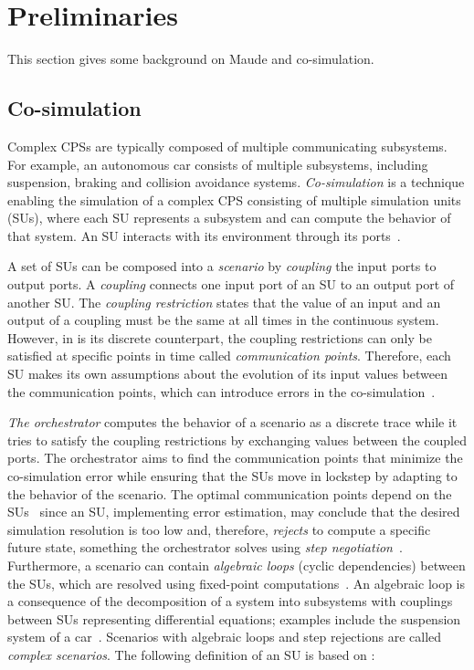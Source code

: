 \section{Preliminaries}\label{sc:background}
This section gives some background on Maude and co-simulation.



\subsection{Co-simulation}
Complex CPSs are typically composed of multiple communicating subsystems.
For example, an autonomous car consists of multiple subsystems, including suspension, braking and collision avoidance systems. 
\emph{Co-simulation} is a technique enabling the simulation of a complex CPS consisting of multiple simulation units (SUs), where each SU represents a subsystem and can compute the behavior of that system.
An SU interacts with its environment through its ports~\cite{Gomes2019a,Kubler2000}.

A set of SUs can be composed into a \emph{scenario} by \emph{coupling} the input ports to output ports. 
A \emph{coupling} connects one input port of an SU to an output port of another SU.
The \emph{coupling restriction} states that the value of an input and an output of a coupling must be the same at all times in the continuous system.
However, in is its discrete counterpart, the coupling restrictions can only be satisfied at specific points in time called \emph{communication points}. 
Therefore, each SU makes its own assumptions about the evolution of its input values between the communication points, which can introduce errors in the co-simulation~\cite{Arnold2014}.

\emph{The orchestrator} computes the behavior of a scenario as a discrete trace while it tries to satisfy the coupling restrictions by exchanging values between the coupled ports. 
The orchestrator aims to find the communication points that minimize the co-simulation error while ensuring that the SUs move in lockstep by adapting to the behavior of the scenario.
The optimal communication points depend on the SUs~\cite{Gomes2019,Oakes2021,Gomes2018f,Schweizer2015c,Gomes2018a}
since an SU, implementing error estimation, may conclude that the desired simulation resolution is too low and, therefore, \emph{rejects} to compute a specific future state, something the orchestrator solves using \emph{step negotiation}~\cite{thrane2021}.
Furthermore, a scenario can contain \emph{algebraic loops} (cyclic dependencies) between the SUs, which are resolved using fixed-point computations~\cite{Kubler2000,Oakes2021,thrane2021}.
An algebraic loop is a consequence of the decomposition of a system into subsystems with couplings between SUs representing differential equations; examples include the suspension system of a car~\cite{thranefmi-based2020}.
Scenarios with algebraic loops and step rejections are called \emph{complex scenarios}.
The following definition of an SU is based on \cite{Broman2013,Gomes2019c,thrane2021}:

